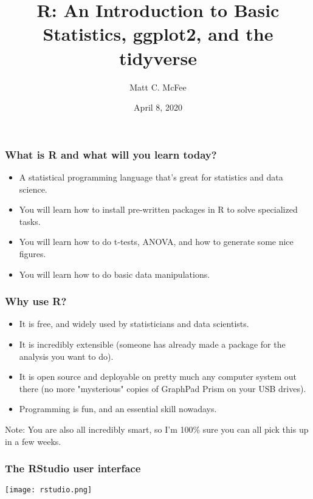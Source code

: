 \documentclass[aspectratio=169]{beamer}
\begin{document}
	
	\title{R: An Introduction to Basic Statistics, ggplot2, and the tidyverse}
	\author{Matt C. McFee}
	\date{April 8, 2020}
	\maketitle
	
	\begin{frame}
	\frametitle{What is R and what will you learn today?}
	\begin{itemize}
		\item A statistical programming language that's great for statistics and data science.
		\item You will learn how to install pre-written packages in R to solve specialized tasks.
		\item You will learn how to do t-tests, ANOVA, and how to generate some nice figures.
		\item You will learn how to do basic data manipulations.
	\end{itemize}
	\end{frame}

	\begin{frame}
		\frametitle{Why use R?}
		\begin{itemize}
			\item It is free, and widely used by statisticians and data scientists.
			\item It is incredibly extensible (someone has already made a package for the analysis you want to do).
			\item It is open source and deployable on pretty much any computer system out there (no more "mysterious" copies of GraphPad Prism on your USB drives).
			\item Programming is fun, and an essential skill nowadays.
		\end{itemize}
		\bigskip
		Note: You are also all incredibly smart, so I'm 100\% sure you can all pick this up in a few weeks.
	\end{frame}

	\begin{frame}
		\frametitle{The RStudio user interface}
		\begin{center}
			\texttt{[image: rstudio.png]}
		\end{center}
		
	\end{frame}
\end{document}
